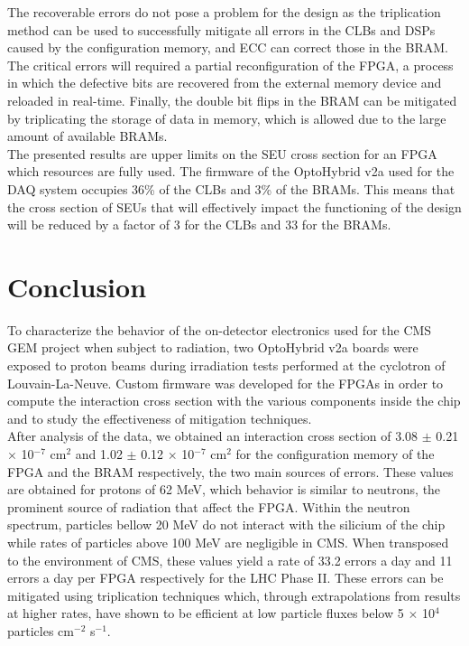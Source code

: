       The recoverable errors do not pose a problem for the design as the triplication method can be used to successfully mitigate all errors in the CLBs and DSPs caused by the configuration memory, and ECC can correct those in the BRAM. The critical errors will required a partial reconfiguration of the FPGA, a process in which the defective bits are recovered from the external memory device and reloaded in real-time. Finally, the double bit flips in the BRAM can be mitigated by triplicating the storage of data in memory, which is allowed due to the large amount of available BRAMs. \\

      The presented results are upper limits on the SEU cross section for an FPGA which resources are fully used. The firmware of the OptoHybrid v2a used for the DAQ system occupies 36\% of the CLBs and 3\% of the BRAMs. This means that the cross section of SEUs that will effectively impact the functioning of the design will be reduced by a factor of 3 for the CLBs and 33 for the BRAMs.

  \section{Conclusion}

    To characterize the behavior of the on-detector electronics used for the CMS GEM project when subject to radiation, two OptoHybrid v2a boards were exposed to proton beams during irradiation tests performed at the cyclotron of Louvain-La-Neuve. Custom firmware was developed for the FPGAs in order to compute the interaction cross section with the various components inside the chip and to study the effectiveness of mitigation techniques.  \\

    After analysis of the data, we obtained an interaction cross section of 3.08 $\pm$ 0.21 $ \times $ 10$^{-7}$ cm$^{2}$ and 1.02 $\pm$ 0.12 $ \times $ 10$^{-7}$ cm$^{2}$ for the configuration memory of the FPGA and the BRAM respectively, the two main sources of errors. These values are obtained for protons of 62 MeV, which behavior is similar to neutrons, the prominent source of radiation that affect the FPGA. Within the neutron spectrum, particles bellow 20 MeV do not interact with the silicium of the chip while rates of particles above 100 MeV are negligible in CMS. When transposed to the environment of CMS, these values yield a rate of 33.2 errors a day and 11 errors a day per FPGA respectively for the LHC Phase II. These errors can be mitigated using triplication techniques which, through extrapolations from results at higher rates, have shown to be efficient at low particle fluxes below 5 $ \times $ 10$^4$ particles cm$^{-2}$ s$^{-1}$. \\

